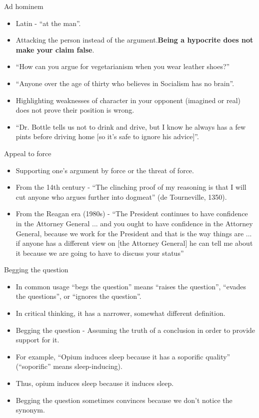 \documentclass{beamer}
\begin{document}
\begin{frame}{Ad hominem}
\begin{itemize}
\item Latin - ``at the man''.
\item Attacking the person instead of the argument.\textbf{Being a hypocrite does not make your claim false}.
\item ``How can you argue for vegetarianism when you wear leather shoes?''
\item ``Anyone over the age of thirty who believes in Socialism has no brain''.
\item Highlighting weaknesses of character in your opponent (imagined or real) does not prove their position is wrong.
\item ``Dr. Bottle tells us not to drink and drive, but I know he always has a few pints before driving home [so it's safe to ignore his advice]''.

\end{itemize}
\end{frame}

\begin{frame}{Appeal to force}
\begin{itemize}
\item Supporting one's argument by force or the threat of force.
\item From the 14th century - ``The clinching proof of my reasoning is that I will cut anyone who argues further into dogmeat'' (de Tourneville, 1350).
\item  From the Reagan era (1980s) - ``The President continues to have confidence in the Attorney General ... and you ought to have confidence in the Attorney General, because we work for the President and that is the way things are ... if anyone has a different view on [the Attorney General] he can tell me about it because we are going to have to discuss your status''
\end{itemize}
\end{frame}

\begin{frame}{Begging the question}
\begin{itemize}
\item In common usage ``begs the question'' means ``raises the question'', ``evades the questions'', or ``ignores the question''. 
\item In critical thinking, it has a narrower, somewhat different definition.
\item Begging the question - Assuming the truth of a conclusion in order to provide support for it.
\item For example, ``Opium induces sleep because it has a soporific quality'' (``soporific'' means sleep-inducing).
\item Thus, opium induces sleep because it induces sleep.
\item Begging the question sometimes convinces because we don't notice the synonym.
\end{itemize}
\end{frame}
\end{document}

